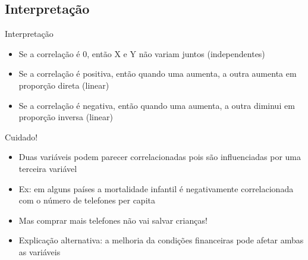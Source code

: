 \documentclass{beamer}
\begin{document}
    

    


\subsection{Interpretação}

\begin{frame}{Interpretação}
  \begin{itemize}
  \item Se a correlação é 0, então X e Y não variam juntos (independentes)
  \item Se a correlação é positiva, então quando uma aumenta, a outra
    aumenta em proporção direta (linear)
  \item Se a correlação é negativa, então quando uma aumenta, a outra
    diminui em proporção inversa (linear)
  \end{itemize}
\end{frame}


\begin{frame}{Cuidado!}
  \begin{itemize}
  \item Duas variáveis podem \alert{parecer} correlacionadas pois são
    influenciadas por uma terceira variável
  \item Ex: em alguns países a mortalidade infantil é negativamente
    correlacionada com o número de telefones per capita
  \item Mas comprar mais telefones não vai salvar crianças!
  \item Explicação alternativa: a melhoria da condições financeiras
    pode afetar ambas as variáveis
  \end{itemize}
\end{frame}
\end{document}
